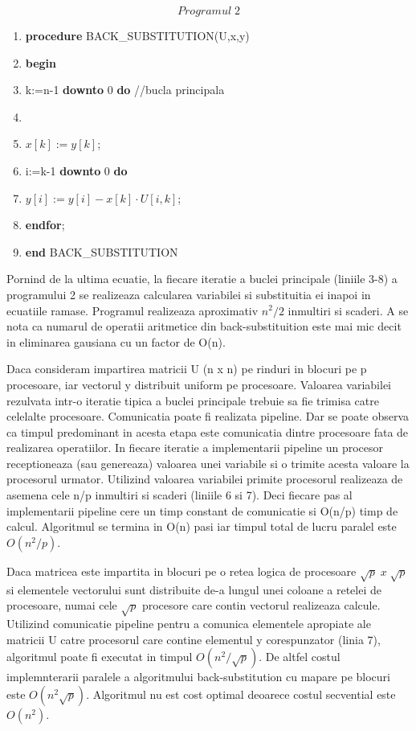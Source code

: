 $$Programul\; 2$$
\begin{enumerate}
\item {\bf procedure} BACK\_SUBSTITUTION(U,x,y)
\item {\bf begin}
\item \hspace{5mm}{\bf for} k:=n-1 {\bf downto} 0 {\bf do} //bucla
principala
\item \hspace{5mm}{\bf begin}
\item \hspace{10mm} $x[k]:=y[k]$;
\item \hspace{10mm}{\bf for} i:=k-1 {\bf downto} 0 {\bf do}
\item \hspace{15mm} $y[i]:=y[i]-x[k]\cdot U[i,k]$;
\item \hspace{5mm} {\bf endfor};
\item {\bf end} BACK\_SUBSTITUTION
\end{enumerate}

Pornind de la ultima ecuatie, la fiecare iteratie a buclei principale
(liniile 3-8) a programului 2 se realizeaza calcularea variabilei si
substituitia ei inapoi in ecuatiile ramase. Programul realizeaza aproximativ
$n^2/2$ inmultiri si scaderi. A se nota ca numarul de operatii aritmetice
din back-substituition este mai mic decit in eliminarea gausiana cu un
factor de O(n).

Daca consideram impartirea matricii U (n x n) pe rinduri in blocuri pe p
procesoare, iar vectorul y distribuit uniform pe procesoare. Valoarea
variabilei rezulvata intr-o iteratie tipica a buclei principale trebuie sa
fie trimisa catre celelalte procesoare. Comunicatia poate fi realizata pipeline.
Dar se  poate observa ca timpul predominant in acesta etapa este comunicatia
dintre procesoare fata de realizarea operatiilor. In fiecare iteratie a
implementarii pipeline un procesor receptioneaza (sau genereaza) valoarea
unei variabile si o trimite acesta valoare la procesorul urmator. Utilizind
valoarea variabilei primite procesorul realizeaza de asemena cele n/p
inmultiri si scaderi (liniile 6 si 7). Deci  fiecare pas al implementarii
pipeline cere un timp constant de comunicatie si O(n/p) timp de calcul.
Algoritmul se termina in O(n) pasi iar timpul total de lucru paralel este
$O(n^2/p)$.

Daca matricea este impartita in blocuri pe o retea logica de procesoare 
$\sqrt{p}\; x\; \sqrt{p}$  si elementele vectorului sunt distribuite de-a
lungul unei coloane a retelei de procesoare, numai cele $\sqrt{p}$ procesore
care contin vectorul realizeaza calcule. Utilizind comunicatie pipeline
pentru a comunica elementele apropiate ale matricii U catre procesorul care
contine elementul y corespunzator (linia 7), algoritmul poate fi executat in
timpul $O(n^2/\sqrt{p})$. De altfel costul implemnterarii paralele a
algoritmului back-substitution cu mapare pe blocuri este $O(n^2\sqrt{p})$.
Algoritmul nu est cost optimal deoarece costul secvential este $O(n^2)$.
